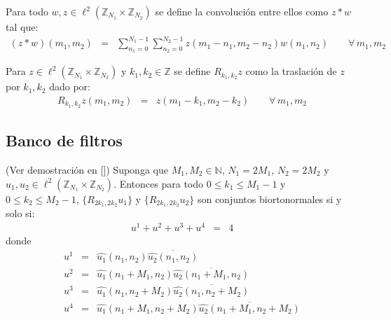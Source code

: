 \begin{definition}
Para todo $w,z\in\ell^2(\mathbb{Z}_{N_1}\times\mathbb{Z}_{N_2})$ se define la convoluci\'on entre ellos como $z\ast w$ tal que:
\begin{eqnarray}
(z\ast w)(m_1,m_2)&=&\sum_{n_1=0}^{N_1-1}\sum_{n_2=0}^{N_2-1}z(m_1-n_1,m_2-n_2)w(n_1,n_2)\qquad\forall\,m_1,m_2\nonumber
\end{eqnarray}
\end{definition}

\begin{definition}
Para $z\in\ell^2(\mathbb{Z}_{N_1}\times\mathbb{Z}_{N_2})$ y $k_1,k_2\in\mathbb{Z}$ se define $R_{k_1,k_2}{z}$ como la traslaci\'on de $z$ por $k_1,k_2$ dado por:
\begin{eqnarray}
R_{k_1,k_2}{z}(m_1,m_2)&=&z(m_1-k_1,m_2-k_2)\qquad\forall\,m_1,m_2\nonumber
\end{eqnarray}
\end{definition}

\subsection{Banco de filtros}

\begin{theorem}
(Ver demostraci\'on en [\textcolor{cyan}{\cite{12}}]) Suponga que $M_1,M_2\in\mathbb{N}$, $N_1=2M_1$, $N_2=2M_2$ y $u_1,u_2\in\ell^2(\mathbb{Z}_{N_1}\times\mathbb{Z}_{N_2})$. Entonces para todo $0\leq k_1 \leq M_1-1$ y $0\leq k_2 \leq M_2-1$, $\{R_{2k_1,2k_2}u_1\}$ y $\{R_{2k_1,2k_2}u_2\}$ son conjuntos biortonormales si y solo si:
\begin{eqnarray}
u^1+u^2+u^3+u^4&=&4\nonumber
\end{eqnarray}
donde
\begin{eqnarray}
u^1&=&\hat{u_1}(n_1,n_2)\overline{\hat{u_2}(n_1,n_2)}\nonumber\\
u^2&=&\hat{u_1}(n_1+M_1,n_2)\overline{\hat{u_2}(n_1+M_1,n_2)}\nonumber\\
u^3&=&\hat{u_1}(n_1,n_2+M_2)\overline{\hat{u_2}(n_1,n_2+M_2)}\nonumber\\
u^4&=&\hat{u_1}(n_1+M_1,n_2+M_2)\overline{\hat{u_2}(n_1+M_1,n_2+M_2)}\nonumber
\end{eqnarray}
\end{theorem}


